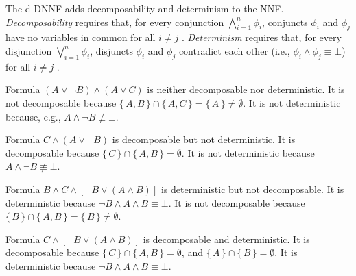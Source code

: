 \begin{definition}
  The d-DNNF adds decomposability and determinism to the NNF. \emph{Decomposability} requires that, for every conjunction $\bigwedge_{i=1}^n \phi_i$, conjuncts $\phi_i$ and $\phi_j$ have no variables in common for all $i \ne j$ \citep{DBLP:conf/ijcai/Darwiche99,DBLP:journals/jacm/Darwiche01}. \emph{Determinism} requires that, for every disjunction $\bigvee_{i=1}^n \phi_i$, disjuncts $\phi_i$ and $\phi_j$ contradict each other (i.e., $\phi_i \land \phi_j \equiv \bot$) for all $i \ne j$ \citep{DBLP:journals/jancl/Darwiche01}.
\end{definition}

\begin{example}
  Formula $(A \lor \neg B) \land (A \lor C)$ is neither decomposable nor deterministic. It is not decomposable because $\{\, A, B \,\} \cap \{\, A, C \,\} = \{\, A \,\} \ne \emptyset$. It is not deterministic because, e.g., $A \land \neg B \not\equiv \bot$.
\end{example}

\begin{example} \label{example:ddnnf1}
  Formula $C \land (A \lor \neg B)$ is decomposable but not deterministic. It is decomposable because $\{\, C \,\} \cap \{\, A, B \,\} = \emptyset$. It is not deterministic because $A \land \neg B \not\equiv \bot$.
\end{example}

\begin{example}
  Formula $B \land C \land [\neg B \lor (A \land B)]$ is deterministic but not decomposable. It is deterministic because $\neg B \land A \land B \equiv \bot$. It is not decomposable because $\{\, B \,\} \cap \{\, A, B \,\} = \{\, B \,\} \ne \emptyset$.
\end{example}

\begin{example} \label{example:ddnnf2}
  Formula $C \land [\neg B \lor (A \land B)]$ is decomposable and deterministic. It is decomposable because $\{\, C \,\} \cap \{\, A, B \,\} = \emptyset$, and $\{\, A \,\} \cap \{\, B \,\} = \emptyset$. It is deterministic because $\neg B \land A \land B \equiv \bot$.
\end{example}


